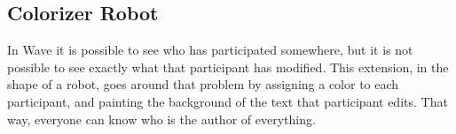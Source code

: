 \subsection{Colorizer Robot}

In Wave it is possible to see who has participated somewhere, but it is not possible to see exactly what that participant has modified. This extension, in the shape of a robot, goes around that problem by assigning a color to each participant, and painting the background of the text that participant edits. That way, everyone can know who is the author of everything.
